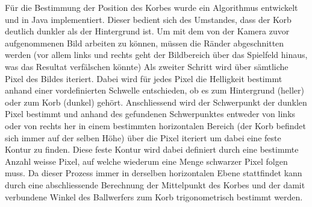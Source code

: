 	Für die Bestimmung der Position des Korbes wurde ein Algorithmus entwickelt und in Java implementiert. 
	Dieser bedient sich des Umstandes, dass der Korb deutlich dunkler als der Hintergrund ist. 
	Um mit dem von der Kamera zuvor aufgenommenen Bild arbeiten zu können, müssen die Ränder abgeschnitten werden 
	(vor allem links und rechts geht der Bildbereich über das Spielfeld hinaus, was das Resultat verfälschen könnte) 
	Als zweiter Schritt wird über sämtliche Pixel des Bildes iteriert. Dabei wird für jedes Pixel die Helligkeit bestimmt 
	anhand einer vordefinierten Schwelle entschieden, ob es zum Hintergrund (heller) oder zum Korb (dunkel) gehört. 
	Anschliessend wird der Schwerpunkt der dunklen Pixel bestimmt und anhand des gefundenen Schwerpunktes entweder
	von links oder von rechts her in einem bestimmten horizontalen Bereich (der Korb befindet sich immer auf der selben Höhe)
	über die Pixel iteriert um dabei eine feste Kontur zu finden. Diese feste Kontur wird dabei definiert durch eine
	bestimmte Anzahl weisse Pixel, auf welche wiederum eine Menge schwarzer Pixel folgen muss. 
	Da dieser Prozess immer in derselben horizontalen Ebene stattfindet kann durch eine abschliessende Berechnung 
	der Mittelpunkt des Korbes und der damit verbundene Winkel des Ballwerfers zum Korb trigonometrisch bestimmt werden.\\
	